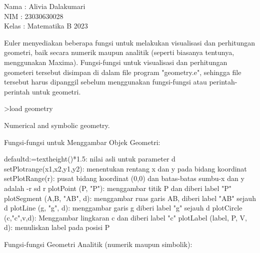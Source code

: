 \documentclass[a4paper,10pt]{article}
\begin{document}
\begin{eulernotebook}
\begin{eulercomment}
Nama  : Alivia Dalakumari\\
NIM   : 23030630028\\
Kelas : Matematika B 2023



\begin{eulercomment}
\begin{eulercomment}
Euler menyediakan beberapa fungsi untuk melakukan visualisasi dan
perhitungan geometri, baik secara numerik maupun analitik (seperti
biasanya tentunya, menggunakan Maxima). Fungsi-fungsi untuk
visualisasi dan perhitungan geometeri tersebut disimpan di dalam file
program "geometry.e", sehingga file tersebut harus dipanggil sebelum
menggunakan fungsi-fungsi atau perintah-perintah untuk geometri.
\end{eulercomment}
\begin{eulerprompt}
>load geometry
\end{eulerprompt}
\begin{euleroutput}
  Numerical and symbolic geometry.
\end{euleroutput}
\begin{eulercomment}
Fungsi-fungsi untuk Menggambar Objek Geometri:

\end{eulercomment}
\begin{eulerttcomment}
  defaultd:=textheight()*1.5: nilai asli untuk parameter d
  setPlotrange(x1,x2,y1,y2): menentukan rentang x dan y pada bidang koordinat
  setPlotRange(r): pusat bidang koordinat (0,0) dan batas-batas sumbu-x dan y adalah -r sd r
  plotPoint (P, "P"): menggambar titik P dan diberi label "P"
  plotSegment (A,B, "AB", d): menggambar ruas garis AB, diberi label "AB" sejauh d
  plotLine (g, "g", d): menggambar garis g diberi label "g" sejauh d
  plotCircle (c,"c",v,d): Menggambar lingkaran c dan diberi label "c"
  plotLabel (label, P, V, d): menuliskan label pada posisi P
\end{eulerttcomment}
\begin{eulercomment}

Fungsi-fungsi Geometri Analitik (numerik maupun simbolik):


\end{eulercomment}
\end{eulercomment}
\end{eulercomment}
\end{eulernotebook}
\end{document}
